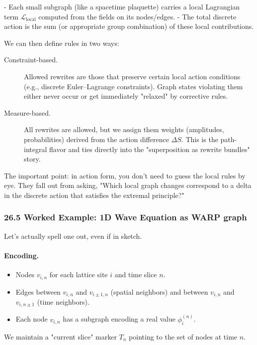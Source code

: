 - Each small subgraph (like a spacetime plaquette) carries a local Lagrangian term $\mathcal{L}_\text{local}$ computed from the fields on its nodes/edges.
- The total discrete action is the sum (or appropriate group combination) of these local contributions.

We can then define rules in two ways:

\begin{description}
  \item[Constraint-based.] Allowed rewrites are those that preserve certain local action conditions (e.g., discrete Euler–Lagrange constraints). Graph states violating them either never occur or get immediately "relaxed" by corrective rules.
  \item[Measure-based.] All rewrites are allowed, but we assign them weights (amplitudes, probabilities) derived from the action difference $\Delta S$. This is the path-integral flavor and ties directly into the "superposition as rewrite bundles" story.
\end{description}

The important point: in action form, you don’t need to guess the local rules by eye. They fall out from asking, "Which local graph changes correspond to a delta in the discrete action that satisfies the extremal principle?"

\subsubsection*{26.5  Worked Example: 1D Wave Equation as WARP graph}

Let’s actually spell one out, even if in sketch.

\paragraph{Encoding.}

\begin{itemize}
  \item Nodes $v_{i,n}$ for each lattice site $i$ and time slice $n$.
  \item Edges between $v_{i,n}$ and $v_{i\pm 1,n}$ (spatial neighbors) and between $v_{i,n}$ and $v_{i,n\pm 1}$ (time neighbors).
  \item Each node $v_{i,n}$ has a subgraph encoding a real value $\phi_{i}^{(n)}$.
\end{itemize}

We maintain a "current slice" marker $T_n$ pointing to the set of nodes at time $n$.

